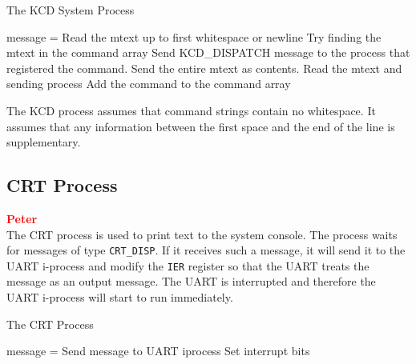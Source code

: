\documentclass[12pt]{report}
\begin{document}
\begin{algorithm}
  \caption{The KCD System Process}
  \begin{algorithmic}[1]
			\State message = 
				\State Read the mtext up to first whitespace or newline
				\State Try finding the mtext in the command array
					\State Send KCD_DISPATCH message to the process that registered the command. Send the entire mtext as contents.
				\EndIf
				\State Read the mtext and sending process
				\State Add the command to the command array
			\EndIf
			\State {}
		\EndWhile
    \EndProcedure
  \end{algorithmic}
\end{algorithm}

The KCD process assumes that command strings contain no whitespace. It assumes that any information between the first space and the end of the line is supplementary.\\

\subsection{CRT Process}

\textcolor{red}{\textbf{Peter}} \\

The CRT process is used to print text to the system console. The process waits for messages of type {\tt CRT\_DISP}. If it receives such a message, it will send it to the UART i-process and modify the {\tt IER} register so that the UART treats the message as an output message. The UART is interrupted and therefore the UART i-process will start to run immediately.\\

\begin{algorithm}
  \caption{The CRT Process}
  \begin{algorithmic}[1]
			\State message = 
				\State Send message to UART iprocess
				\State Set interrupt bits
			\Else
				\State {}
			\EndIf
		\EndWhile
    \EndProcedure
  \end{algorithmic}
\end{algorithm}

\end{document}
